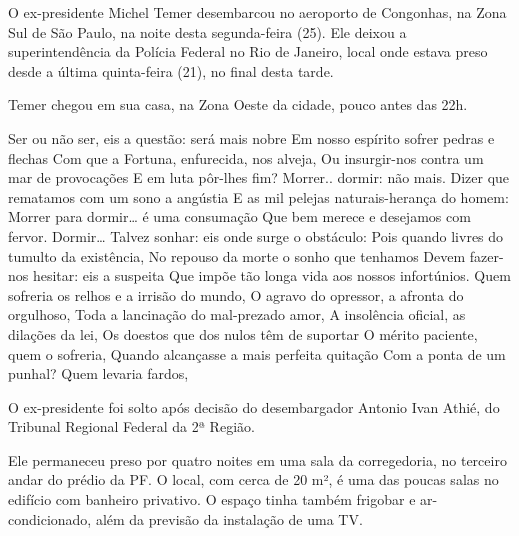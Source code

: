 \label{secintro}

O ex-presidente Michel Temer desembarcou no aeroporto de Congonhas, na Zona Sul de São Paulo, na noite desta segunda-feira (25). Ele deixou a superintendência da Polícia Federal no Rio de Janeiro, local onde estava preso desde a última quinta-feira (21), no final desta tarde.

Temer chegou em sua casa, na Zona Oeste da cidade, pouco antes das 22h.

Ser ou não ser, eis a questão: será mais nobre
Em nosso espírito sofrer pedras e flechas
Com que a Fortuna, enfurecida, nos alveja,
Ou insurgir-nos contra um mar de provocações
E em luta pôr-lhes fim? Morrer.. dormir: não mais.
Dizer que rematamos com um sono a angústia
E as mil pelejas naturais-herança do homem:
Morrer para dormir… é uma consumação
Que bem merece e desejamos com fervor.
Dormir… Talvez sonhar: eis onde surge o obstáculo:
Pois quando livres do tumulto da existência,
No repouso da morte o sonho que tenhamos
Devem fazer-nos hesitar: eis a suspeita
Que impõe tão longa vida aos nossos infortúnios.
Quem sofreria os relhos e a irrisão do mundo,
O agravo do opressor, a afronta do orgulhoso,
Toda a lancinação do mal-prezado amor,
A insolência oficial, as dilações da lei,
Os doestos que dos nulos têm de suportar
O mérito paciente, quem o sofreria,
Quando alcançasse a mais perfeita quitação
Com a ponta de um punhal? Quem levaria fardos,

O ex-presidente foi solto após decisão do desembargador Antonio Ivan Athié, do Tribunal Regional Federal da 2ª Região.

Ele permaneceu preso por quatro noites em uma sala da corregedoria, no terceiro andar do prédio da PF. O local, com cerca de 20 m², é uma das poucas salas no edifício com banheiro privativo. O espaço tinha também frigobar e ar-condicionado, além da previsão da instalação de uma TV.




